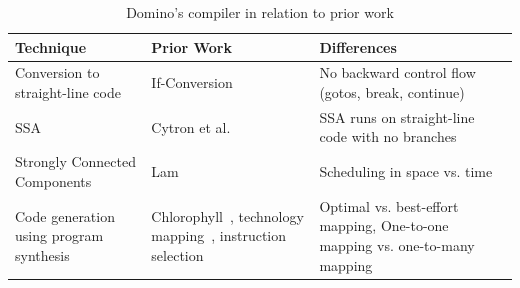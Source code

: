 \begin{table}[!t]
  \begin{scriptsize}
    \begin{tabular}{|p{}|p{}|p{}|}
  \hline
  Technique & Prior Work & Differences \\
  \hline
  Conversion to straight-line code & If-Conversion~\cite{if_conversion} & No backward control flow (gotos, break, continue) \\
  \hline
  SSA & Cytron et al.~\cite{ssa} & SSA runs on straight-line code with no branches \\
  \hline
  Strongly Connected Components & Lam~\cite{software_pipelining} & Scheduling in space vs. time \\
  \hline
  Code generation using program synthesis & Chlorophyll~\cite{chlorophyll}, technology mapping~\cite{micheli}, instruction selection~\cite{dragonbook} & Optimal vs. best-effort mapping, One-to-one mapping vs. one-to-many mapping \\
  \hline
  \end{tabular}
  \end{scriptsize}
  \caption{Domino's compiler in relation to prior work}
  \label{tab:prior_compiler}
\end{table}
